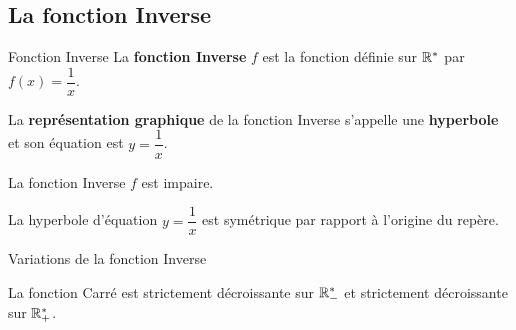 
\begin{pageCours} %


\subsection{La fonction Inverse}



\begin{DefT}{Fonction Inverse}
La \textbf{fonction Inverse} $f$ est la fonction définie sur $\mathbb R^*$ par $f(x)=\dfrac{1}{x}$.
 
La \textbf{représentation graphique} de la fonction Inverse s'appelle une \textbf{hyperbole} et son équation est $y=\dfrac{1}{x}$. 
\end{DefT}

\begin{minipage}{0.48\linewidth}
\begin{Th} 
La fonction Inverse $f$ est impaire.

La hyperbole d'équation $y=\dfrac{1}{x}$ est symétrique par rapport à l'origine du repère.
\end{Th}


\begin{ThT}{Variations de la fonction Inverse}

La fonction Carré est strictement décroissante sur $\mathbb R^*_-$ et strictement décroissante sur $\mathbb R^*_+$. 


\end{ThT}

\end{minipage}
\hfill
\begin{minipage}{0.48\linewidth}


\end{minipage}
\end{pageCours}
